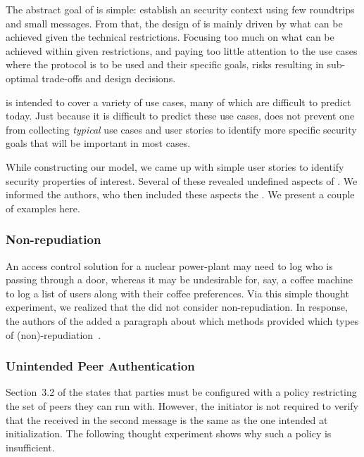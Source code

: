 \documentclass[runningheads, envcountsame, hidelinks, a4paper, x11names]{article}
\begin{document}
The abstract goal of \mEdhoc{} is simple: establish an \mOscore{} security
context using few roundtrips and small messages.
%
From that, the design of \mEdhoc{} is mainly driven by what
can be achieved given the technical restrictions.
%
Focusing too much on what can be achieved within given restrictions, and paying
too little attention to the use cases where the
protocol is to be used and their specific goals, risks resulting in
sub-optimal trade-offs and design decisions.
%

\mEdhoc{} is intended to cover a variety of use cases, many of which are
difficult to predict today.
%
Just because it is difficult to predict these use cases, does not
prevent one from collecting \emph{typical} use cases and user stories
to identify more specific security goals that will be important in most cases.
%

While constructing our model, we came up with simple user stories to identify
security properties of interest.
%
Several of these revealed undefined aspects of \mEdhoc{}.
%
We informed the \mEdhoc{} authors, who then included these aspects the \mSpec{}.
%
We present a couple of examples here.
%

\subsubsection{Non-repudiation}
An access control solution for a nuclear power-plant may need to log who is
passing through a door, whereas it may be undesirable for, say, a coffee
machine to log a list of users along with their coffee preferences.
%
Via this simple thought experiment, we realized that the \mSpec{} did not
consider non-repudiation.
%
In response, the authors of the \mSpec{} added a paragraph about which methods
provided which types of (non)-repudiation~\cite{selander-lake-edhoc-01}. 

\subsubsection{Unintended Peer Authentication}
Section~3.2 of the \mSpec{} states that parties must be configured
with a policy restricting the set of peers they can run \mEdhoc{} with.
%
However, the initiator is not required to verify that the \mIdcredr{} received
in the second message is the same as the one intended at initialization.
%
The following thought experiment shows why such a policy is insufficient.
%
\end{document}
